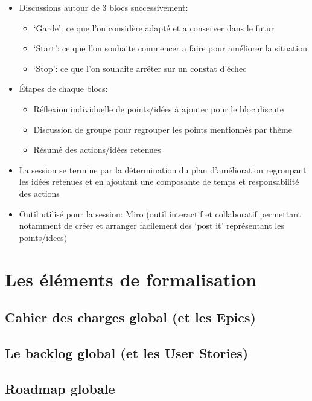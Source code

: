 \begin{itemize}
      \item Discussions autour de 3 blocs successivement:
      \begin{itemize}
            \item ‘Garde’: ce que l’on considère adapté et a conserver dans le futur
            \item ‘Start’: ce que l’on souhaite commencer a faire pour améliorer la situation
            \item ‘Stop’: ce que l’on souhaite arrêter sur un constat d'échec
      \end{itemize}
      \item Étapes de chaque blocs:
      \begin{itemize}
            \item Réflexion individuelle de points/idées à ajouter pour le bloc discute
            \item Discussion de groupe pour regrouper les points mentionnés par thème
            \item Résumé des actions/idées retenues
      \end{itemize}
      \item La session se termine par la détermination du plan d'amélioration regroupant les 
      idées retenues et en ajoutant une composante de temps et responsabilité des actions
      \item Outil utilisé pour la session: Miro (outil interactif et collaboratif permettant notamment de créer et arranger facilement des ‘post it’ représentant les points/idees)
\end{itemize}

\section{Les éléments de formalisation}

\subsection{Cahier des charges global (et les Epics)}

\subsection{Le backlog global (et les User Stories)}

\subsection{Roadmap globale}

